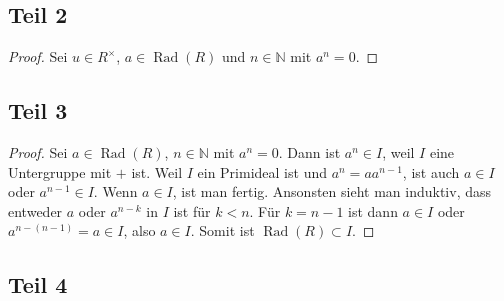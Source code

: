 \documentclass[10pt,a4paper]{article}
\DeclareMathOperator{\rad}{Rad}
\begin{document}
\subsection{Teil 2}

\begin{proof}
  Sei $u \in R^{\times}$, $a \in \rad(R)$ und $n \in \mathbb{N}$ mit $a^{n} = 0$.
\end{proof}

\subsection{Teil 3}

\begin{proof}
  Sei $a \in \rad(R)$, $n \in \mathbb{N}$ mit $a^{n} = 0$.
  Dann ist $a^{n} \in I$, weil $I$ eine Untergruppe mit $+$ ist.
  Weil $I$ ein Primideal ist und $a^{n} = aa^{n - 1}$, ist auch $a \in I$ oder $a^{n - 1} \in I$.
  Wenn $a \in I$, ist man fertig.
  Ansonsten sieht man induktiv, dass entweder $a$ oder $a^{n - k}$ in $I$ ist für $k < n$.
  Für $k = n - 1$ ist dann $a \in I$ oder $a^{n - (n - 1)} = a \in I$, also $a \in I$.
  Somit ist $\rad(R) \subset I$.
\end{proof}

\subsection{Teil 4}
\end{document}
